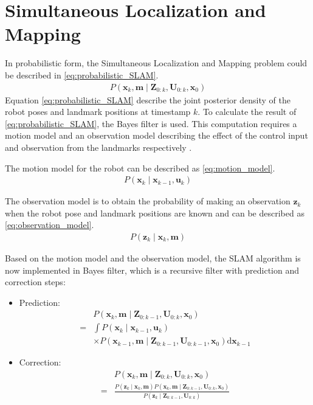 \documentclass[conference]{IEEEtran}
\begin{document}
\section{Simultaneous Localization and Mapping}
\par In probabilistic form, the Simultaneous Localization and Mapping problem could be described in \eqref{eq:probabilistic_SLAM}.
	\begin{align}
		P(\mathbf{x}_{k}, \mathbf{m} \;\vert\; \mathbf{Z}_{0:k}, \mathbf{U}_{0:k}, \mathbf{x}_{0})
		\label{eq:probabilistic_SLAM}
	\end{align}
Equation \eqref{eq:probabilistic_SLAM} describe the joint posterior density of the robot poses and landmark positions at timestamp $k$. To calculate the result of \eqref{eq:probabilistic_SLAM}, the Bayes filter is used. This computation requires a motion model and an observation model describing the effect of the control input and observation from the landmarks respectively \cite{SLAM-01}.
\par The motion model for the robot can be described as \eqref{eq:motion_model}.
	\begin{align}
		P(\mathbf{x}_{k} \;\vert\; \mathbf{x}_{k-1}, \mathbf{u}_{k}) \label{eq:motion_model}
	\end{align}
\par The observation model is to obtain the probability of making an observation $\mathbf{z}_{k}$ when the robot pose and landmark positions are known and can be described as \eqref{eq:observation_model}.
	\begin{align}
		P(\mathbf{z}_{k} \;\vert\; \mathbf{x}_{k}, \mathbf{m}) \label{eq:observation_model}
	\end{align}
\par Based on the motion model and the observation model, the SLAM algorithm is now implemented in Bayes filter, which is a recursive filter with prediction and correction steps:
	\begin{itemize}
		\item Prediction:
			\begin{align}
				& P(\mathbf{x}_{k}, \mathbf{m} \;\vert\; \mathbf{Z}_{0:k-1}, \mathbf{U}_{0:k}, \mathbf{x}_{0}) \nonumber \\
				= & \int P(\mathbf{x}_{k} \;\vert\; \mathbf{x}_{k-1}, \mathbf{u}_{k}) \nonumber \\
				& \times P(\mathbf{x}_{k-1}, \mathbf{m} \;\vert\; \mathbf{Z}_{0:k-1}, \mathbf{U}_{0:k-1}, \mathbf{x}_{0}) \mathrm{d}\mathbf{x}_{k-1} \label{eq:prediction}
			\end{align}
		\item Correction:
			\begin{align}
				& P(\mathbf{x}_{k}, \mathbf{m} \;\vert\; \mathbf{Z}_{0:k}, \mathbf{U}_{0:k}, \mathbf{x}_{0}) \nonumber \\
				= & \frac{P(\mathbf{z}_{k} \;\vert\; \mathbf{x}_{k}, \mathbf{m})P(\mathbf{x}_{k}, \mathbf{m} \;\vert\; \mathbf{Z}_{0:k-1}, \mathbf{U}_{0:k}, \mathbf{x}_{0})}{P(\mathbf{z}_{k} \;\vert\; \mathbf{Z}_{0:k-1}, \mathbf{U}_{0:k})} \label{eq:correction}
			\end{align}
	\end{itemize}
\end{document}
